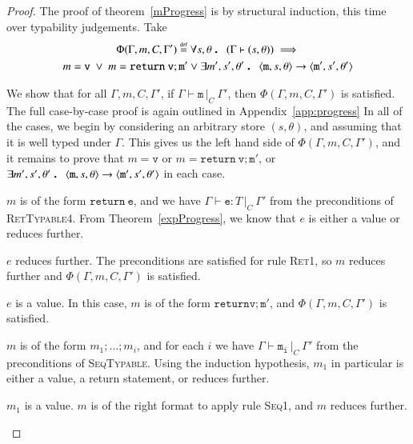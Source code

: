 \documentclass[12pt,a4paper,twoside,openright]{report}
\theoremstyle{definition}
\theoremstyle{dotless}
\newcommand{\typable}[2][ ]{\Gamma{}\vdash\mathtt{#2}\, |_C#1\:\Gamma#1'}
\newcommand{\typed}[2]{\Gamma{}\vdash\mathtt{#1}: #2\,|_C\:\Gamma'}
\newcommand{\transition}[6]{\langle{}\mathtt{#1},#2,#3\rangle{}\rightarrow{}\langle{}\mathtt{#4},#5,#6\rangle}
\newcommand{\indHyp}{\Phi(\Gamma, m, C, \Gamma')}
\newcommand\eqdef{\mathrel{\overset{\makebox[0pt]{\mbox{\normalfont\tiny def}}}{=}}}
\newcommand\qdot{\mathbin{\scalebox{1.5}{.}}\enspace}
\begin{document}
\begin{proof}

  The proof of theorem~\ref{mProgress} is by structural induction, this time
  over typability judgements. Take
  \begin{multline*}
  	\indHyp \eqdef
  	\forall s,\theta\qdot (\Gamma \vdash (s,\theta))\implies \\
  	m=\mathtt{v}\ \vee\ m=\mathtt{return\ v; m'} \vee
  	\exists m', s',\theta'\qdot \transition{m}{s}{\theta}{m'}{s'}{\theta'}
  \end{multline*}

  We show that for all $\Gamma, m, C, \Gamma'$, if $\typable{m}$, then
  $\indHyp$ is satisfied. The full case-by-case proof is again outlined in
  Appendix~\ref{app:progress}
  In all of the cases, we begin by considering an arbitrary store
  $(s,\theta)$, and assuming that it is well typed under $\Gamma$. This gives
  us the left hand side of $\indHyp$, and it remains to prove that
  $m=\mathtt{v}$ or $m=\mathtt{return\ v; m'}$, or $\exists m', s',\theta'\qdot
  \transition{m}{s}{\theta}{m'}{s'}{\theta'}$ in each case.

  \begin{case}[RetTypable4]
  	$m$ is of the form $\mathtt{return\ e}$, and we have $\typed{e}{T}$ from
	the preconditions of \textsc{RetTypable4}. From Theorem~\ref{expProgress},
	we know that $e$ is either a value or reduces further.

  	\begin{subcase}
  	  $e$ reduces further.
  	  The preconditions are satisfied for rule \textsc{Ret1}, so $m$ reduces
  	  further and $\indHyp$ is satisfied.  
  	\end{subcase}

  	\begin{subcase}
  	  $e$ is a value.
  	  In this case, $m$ is of the form $\mathtt{return v; m'}$, and $\indHyp$
	  is satisfied.
	\end{subcase}  

  \end{case}

  \begin{case}[SeqTypable]

	$m$ is of the form $m_1; \dots; m_i$, and for each $i$ we have
	$\typable{m_i}$ from the preconditions of \textsc{SeqTypable}. Using the
	induction hypothesis, $m_1$ in particular is either a value, a return
	statement, or reduces further.

	\begin{subcase}
	  $m_1$ is a value.
	  $m$ is of the right format to apply rule \textsc{Seq1}, and $m$ reduces
	  further. 
	\end{subcase}


\end{case}
\end{proof}
\end{document}
